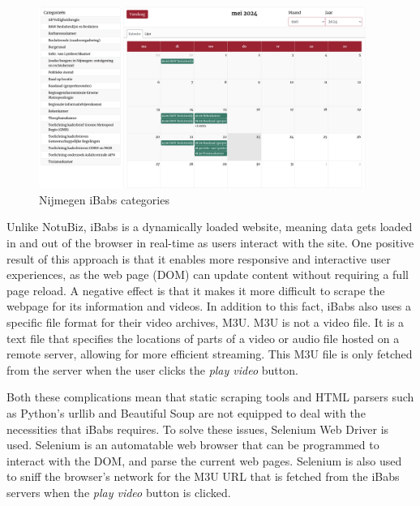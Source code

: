 \documentclass[twoside]{uva-inf-bachelor-thesis}
\begin{document}
\begin{figure}
    \centering
    \includegraphics[width=0.95\textwidth]{images/ibabsCats.png}
    \caption{Nijmegen iBabs categories}
    \label{fig:ibabsCats}
\end{figure}

Unlike NotuBiz, iBabs is a dynamically loaded website, meaning data gets loaded in and out of the browser in real-time as users interact with the site. One positive result of this approach is that it enables more responsive and interactive user experiences, as the web page (DOM) can update content without requiring a full page reload. A negative effect is that it makes it more difficult to scrape the webpage for its information and videos.
In addition to this fact, iBabs also uses a specific file format for their video archives, M3U. M3U is not a video file. It is a text file that specifies the locations of parts of a video or audio file hosted on a remote server, allowing for more efficient streaming. This M3U file is only fetched from the server when the user clicks the \textit{play video} button. 

Both these complications mean that static scraping tools and HTML parsers such as Python's urllib and Beautiful Soup are not equipped to deal with the necessities that iBabs requires. To solve these issues, Selenium Web Driver is used. Selenium is an automatable web browser that can be programmed to interact with the DOM, and parse the current web pages. Selenium is also used to sniff the browser's network for the M3U URL that is fetched from the iBabs servers when the \textit{play video} button is clicked. 
\end{document}
